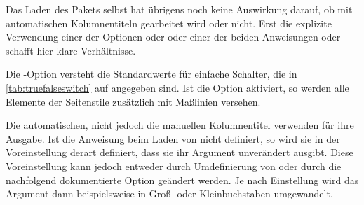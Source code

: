   Das Laden des Pakets selbst hat übrigens noch keine
  Auswirkung darauf, ob mit automatischen Kolumnentiteln gearbeitet wird oder
  nicht. Erst die explizite Verwendung einer der Optionen 
  oder  oder einer der beiden Anweisungen
   oder 
  schafft hier klare Verhältnisse.%
  \EndIndexGroup
  \EndIndexGroup


  \begin{Declaration}
  \end{Declaration}
  Die \KOMAScript-Option versteht die Standardwerte für einfache Schalter, die
  in \autoref{tab:truefalseswitch} auf 
  angegeben sind. Ist die Option aktiviert, so werden
   alle
  Elemente der Seitenstile zusätzlich mit
  Maßlinien
  versehen. %
  \EndIndexGroup


  \begin{Declaration}
  \end{Declaration}
  Die automatischen, nicht jedoch die manuellen Kolumnentitel verwenden
   für ihre Ausgabe. Ist die Anweisung beim Laden von
   nicht definiert, so wird sie in der
  Voreinstellung derart definiert, dass sie ihr Argument 
  unverändert ausgibt. Diese Voreinstellung kann jedoch entweder durch
  Umdefinierung von  oder durch die nachfolgend
  dokumentierte Option %
  geändert werden. Je nach Einstellung wird das Argument dann beispielsweise
  in Groß- oder Kleinbuchstaben umgewandelt.
  \EndIndexGroup


